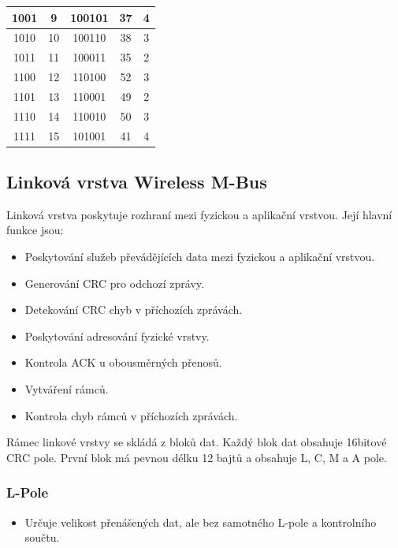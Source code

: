 \begin{table}[!ht]
\begin{tabular}{|c|c|c|c|c|}
1001             & 9                  & 100101              & 37                 & 4                          \\ \hline
1010             & 10                 & 100110              & 38                 & 3                          \\ \hline
1011             & 11                 & 100011              & 35                 & 2                          \\ \hline
1100             & 12                 & 110100              & 52                 & 3                          \\ \hline
1101             & 13                 & 110001              & 49                 & 2                          \\ \hline
1110             & 14                 & 110010              & 50                 & 3                          \\ \hline
1111             & 15                 & 101001              & 41                 & 4                          \\ \hline \hline
\end{tabular}
\end{table}

\subsection{Linková vrstva Wireless M-Bus}

Linková vrstva poskytuje rozhraní mezi fyzickou a aplikační vrstvou. Její hlavní funkce jsou:
\begin{itemize}
	\item Poskytování služeb převádějících data mezi fyzickou a aplikační vrstvou.
	\item Generování CRC pro odchozí zprávy.
	\item Detekování CRC chyb v příchozích zprávách.
	\item Poskytování adresování fyzické vrstvy.
	\item Kontrola ACK u obousměrných přenosů.
	\item Vytváření rámců.
	\item Kontrola chyb rámců v příchozích zprávách.
\end{itemize}

Rámec linkové vrstvy se skládá z bloků dat. Každý blok dat obsahuje 16bitové CRC pole.  První blok má pevnou délku 12 bajtů a obsahuje L, C, M a A pole.

\subsubsection{L-Pole}
\begin{itemize}
	\item Určuje velikost přenášených dat, ale bez samotného L-pole a kontrolního součtu.	
\end{itemize}

